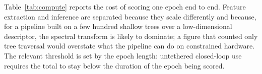 Table~\ref{tab:compute} reports the cost of scoring one epoch end to end.
Feature extraction and inference are separated because they scale
differently and because, for a pipeline built on a few hundred shallow
trees over a low-dimensional descriptor, the spectral transform is likely
to dominate; a figure that counted only tree traversal would overstate
what the pipeline can do on constrained hardware. The relevant threshold
is set by the epoch length: untethered closed-loop use requires the total
to stay below the duration of the epoch being scored.


%
%
%
%
